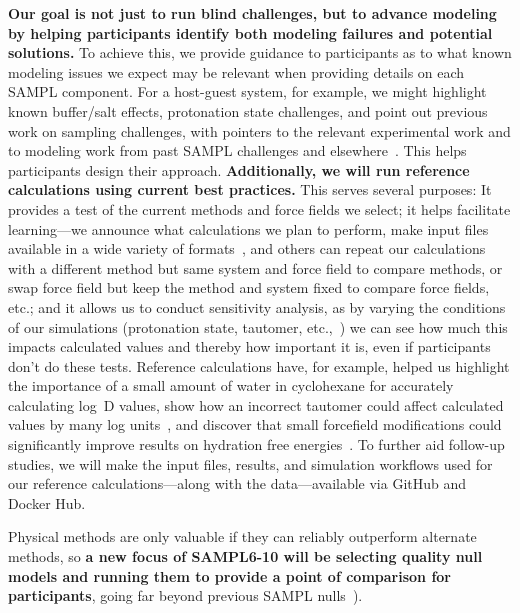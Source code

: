 \documentclass[11pt]{article}
\begin{document}
\textbf{Our goal is not just to run blind challenges, but to advance modeling by helping participants identify both modeling failures and potential solutions.} 
To achieve this, we provide guidance to participants as to what known modeling issues we expect may be relevant when providing details on each SAMPL component.
For a host-guest system, for example, we might highlight known buffer/salt effects, protonation state challenges, and point out previous work on sampling challenges, with pointers to the relevant experimental work and to modeling work from past SAMPL challenges and elsewhere~\cite{mobley_predicting_2016}.
This helps participants design their approach.
{\bf Additionally, we will run reference calculations using current best practices.} 
This serves several purposes:
It provides a test of the current methods and force fields we select; 
it helps facilitate learning---we announce what calculations we plan to perform, make input files available in a wide variety of formats~\cite{shirts_lessons_2016, yin_overview_2016, bannan_blind_2016}, and others can repeat our calculations with a different method but same system and force field to compare methods, or swap force field but keep the method and system fixed to compare force fields, etc.; 
and it allows us to conduct sensitivity analysis, as by varying the conditions of our simulations (protonation state, tautomer, etc.,~\cite{bannan_blind_2016}) we can see how much this impacts calculated values and thereby how important it is, even if participants don't do these tests.
Reference calculations have, for example, helped us highlight the importance of a small amount of water in cyclohexane for accurately calculating log~D values, show how an incorrect tautomer could affect calculated values by many log units~\cite{bannan_blind_2016}, and discover that small forcefield modifications could significantly improve results on hydration free energies~\cite{mobley_blind_2014-1}.
To further aid follow-up studies, we will make the input files, results, and simulation workflows used for our reference calculations---along with the data---available via GitHub and Docker Hub.


Physical methods are only valuable if they can reliably outperform alternate methods, so \textbf{a new focus of SAMPL6-10 will be selecting quality null models and running them to provide a point of comparison for participants}, going far beyond previous SAMPL nulls~\cite{bannan_blind_2016, paranahewage_predicting_2016, muddana_sampl4_2014}).
\end{document}
